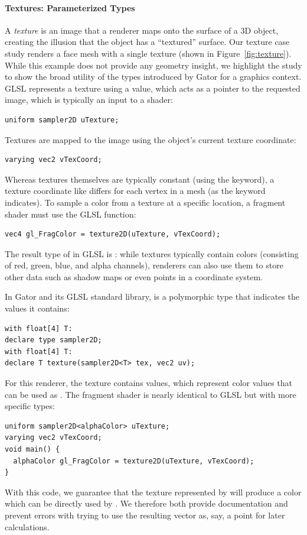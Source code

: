 \documentclass[../main.tex]{subfiles}
\begin{document}
{\paragraph{Textures: Parameterized Types}
A \emph{texture} is an image that a renderer maps onto the surface of a 3D object, creating the illusion that the object has a ``textured'' surface.
Our texture case study renders a face mesh with a single texture (shown in Figure~\ref{fig:texture}).
While this example does not provide any geometry insight, we highlight the study to show the broad utility of the types introduced by Gator for a graphics context.
GLSL represents a texture using a  value, which acts as a pointer to the requested image, which is typically an input to a shader:
%
\begin{lstlisting}
uniform sampler2D uTexture;
\end{lstlisting}
%
Textures are mapped to the image using the object's current texture coordinate:
%
\begin{lstlisting}
varying vec2 vTexCoord;
\end{lstlisting}
%
Whereas textures themselves are typically constant (using the  keyword), a texture coordinate like  differs for each vertex in a mesh (as the  keyword indicates).
To sample a color from a texture at a specific location, a fragment shader must use the GLSL  function:
%
\begin{lstlisting}
vec4 gl_FragColor = texture2D(uTexture, vTexCoord);
\end{lstlisting}
%
The result type of  in GLSL is : while textures typically contain colors (consisting of red, green, blue, and alpha channels), renderers can also use them to store other data such as shadow maps or even points in a coordinate system.

In Gator and its GLSL standard library,  is a polymorphic type that indicates the values it contains:
\begin{lstlisting}
with float[4] T:
declare type sampler2D;
with float[4] T:
declare T texture(sampler2D<T> tex, vec2 uv);
\end{lstlisting}
For this renderer, the texture contains  values, which represent color values that can be used as .
The fragment shader is nearly identical to GLSL but with more specific types:
%
\begin{lstlisting}
uniform sampler2D<alphaColor> uTexture;
varying vec2 vTexCoord;
void main() {
  alphaColor gl_FragColor = texture2D(uTexture, vTexCoord);
}
\end{lstlisting}
%
With this code, we guarantee that the texture represented by  will produce a color which can be directly used by .  We therefore both provide documentation and prevent errors with trying to use the resulting vector as, say, a point for later calculations.

}
\end{document}
